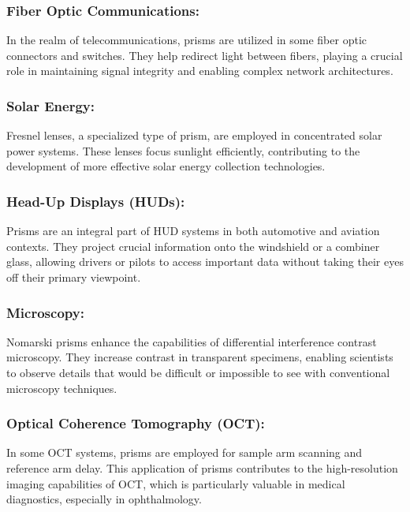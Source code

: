 \documentclass[
  a4paper,
]{book}
\begin{document}
\begin{tcolorbox}
\subsubsection{Fiber Optic
Communications:}\label{fiber-optic-communications}

In the realm of telecommunications, prisms are utilized in some fiber
optic connectors and switches. They help redirect light between fibers,
playing a crucial role in maintaining signal integrity and enabling
complex network architectures.

\subsubsection{Solar Energy:}\label{solar-energy}

Fresnel lenses, a specialized type of prism, are employed in
concentrated solar power systems. These lenses focus sunlight
efficiently, contributing to the development of more effective solar
energy collection technologies.

\subsubsection{Head-Up Displays (HUDs):}\label{head-up-displays-huds}

Prisms are an integral part of HUD systems in both automotive and
aviation contexts. They project crucial information onto the windshield
or a combiner glass, allowing drivers or pilots to access important data
without taking their eyes off their primary viewpoint.

\subsubsection{Microscopy:}\label{microscopy}

Nomarski prisms enhance the capabilities of differential interference
contrast microscopy. They increase contrast in transparent specimens,
enabling scientists to observe details that would be difficult or
impossible to see with conventional microscopy techniques.

\subsubsection{Optical Coherence Tomography
(OCT):}\label{optical-coherence-tomography-oct}

In some OCT systems, prisms are employed for sample arm scanning and
reference arm delay. This application of prisms contributes to the
high-resolution imaging capabilities of OCT, which is particularly
valuable in medical diagnostics, especially in ophthalmology.

\end{tcolorbox}
\end{document}
